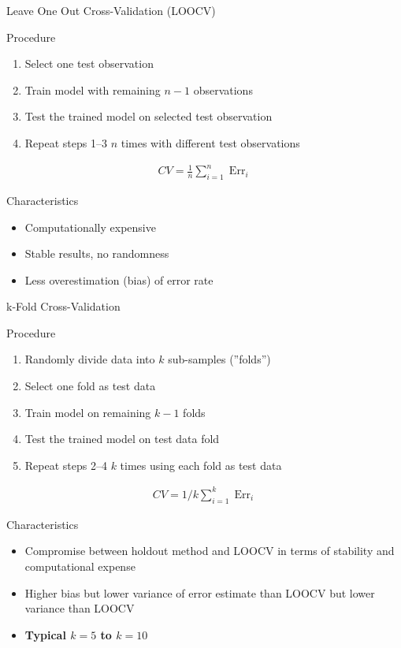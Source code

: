 \documentclass[ignorenonframetext,xcolor=x11names]{beamer}
\begin{document}
\begin{frame}{Leave One Out Cross-Validation (LOOCV)}
\begin{block}{Procedure}
\begin{enumerate}
\item Select one test observation
\item Train model with remaining $n-1$ observations
\item Test the trained model on selected test observation
\item Repeat steps 1--3 $n$ times with different test observations
\end{enumerate}
\begin{align*}
CV = \frac{1}{n} \sum\nolimits_{i=1}^n \operatorname{Err}_i
\end{align*}
\end{block}

\begin{block}{Characteristics}
\begin{itemize} 
  \item Computationally expensive
  \item Stable results, no randomness
  \item Less overestimation (bias) of error rate
\end{itemize}
\end{block}
\end{frame}

\begin{frame}{k-Fold Cross-Validation}
\begin{block}{Procedure}
\begin{enumerate}
\item Randomly divide data into $k$ sub-samples (''folds'')
\item Select one fold as test data
\item Train model on remaining $k-1$ folds
\item Test the trained model on test data fold
\item Repeat steps 2--4 $k$ times using each fold as test data
\end{enumerate}
\begin{align*}
CV = 1/k \sum\nolimits_{i=1}^k \operatorname{Err}_i
\end{align*}
\vspace{-\baselineskip}
\end{block}

\begin{block}{Characteristics}
\begin{itemize}
   \item Compromise between holdout method and LOOCV in terms of stability and computational expense
   \item Higher bias but lower variance of error estimate than LOOCV but lower variance than LOOCV
   \item \textbf{Typical $k=5$ to $k=10$}
\end{itemize}
\end{block}
\end{frame}
\end{document}
